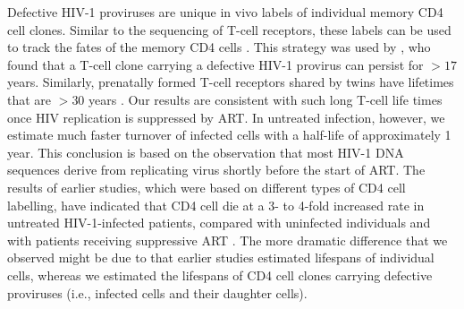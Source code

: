 \documentclass[aps,rmp,onecolumn,linenumbers]{revtex4-1}
\begin{document}
Defective HIV-1 proviruses are unique in vivo labels of individual memory CD4 cell clones. Similar to the sequencing of T-cell receptors, these labels can be used to track the fates of the memory CD4 cells \cite{robins_immunosequencing:_2013}. This strategy was used by \citet{imamichi_lifespan_2014}, who found that a T-cell clone carrying a defective HIV-1 provirus can persist for $>17$ years. Similarly, prenatally formed T-cell receptors shared by twins have lifetimes that are $>30$ years \cite{pogorelyy_persisting_2016}. 
Our results are consistent with such long T-cell life times once HIV replication is suppressed by ART.
In untreated infection, however, we estimate much faster turnover of infected cells with a half-life of approximately 1 year. 
This conclusion is based on the observation that most HIV-1 DNA sequences derive from replicating virus shortly before the start of ART. 
The results of earlier studies, which were based on different types of CD4 cell labelling, have indicated that CD4 cell die at a 3- to 4-fold increased rate in untreated HIV-1-infected patients, compared with uninfected individuals and with patients receiving suppressive ART \cite{hellerstein_directly_1999,mccune_factors_2000,ribeiro_vivo_2002}. The more dramatic difference that we observed might be due to that earlier studies estimated lifespans of individual cells, whereas we estimated the lifespans of CD4 cell clones carrying defective proviruses (i.e., infected cells and their daughter cells). 
\end{document}
